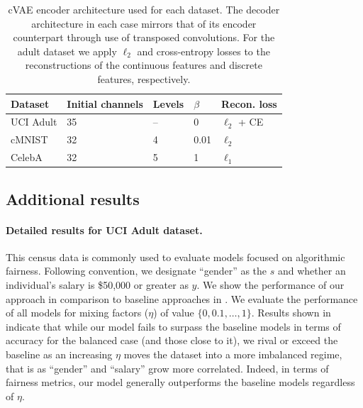 \begin{table}[tp]
\caption{
    \ac{cVAE} encoder architecture used for each dataset. The decoder architecture in each case mirrors that
of its encoder counterpart through use of transposed convolutions. For the adult dataset we apply
$\ell_2$ and cross-entropy losses to the reconstructions of the continuous features and discrete
features, respectively. }
\label{tab:vae_architectures}
\centering
\begin{tabular}{lllll}
\toprule
Dataset   & Initial channels & Levels & $\beta$ & Recon. loss \\
\midrule
UCI Adult & 35               & --     & 0       & $\ell_2$ + CE\\
cMNIST    & 32               & 4      & 0.01    & $\ell_2$ \\
CelebA    & 32               & 5      & 1       & $\ell_1$ \\ 
\bottomrule
\end{tabular}
\end{table}
%
\subsection{Additional results}\label{sec:additional-results}
%
\paragraph{Detailed results for UCI Adult dataset.}
%
This census data is commonly used to evaluate models focused on algorithmic fairness. 
%
Following convention, we designate ``gender'' as the $s$ and whether an individual's salary is
\$50,000 or greater as $y$. 
%
We show the performance of our approach in comparison to baseline approaches in
. 
%
We evaluate the performance of all models for mixing factors ($\eta$) of value \( \{0, 0.1, \dots,
1\} \). 
%
Results shown in  indicate that while our model fails to surpass the
baseline models in terms of accuracy for the balanced case (and those close to it), we rival or
exceed the baseline as an increasing \(\eta\) moves the dataset into a more imbalanced regime, that
is as ``gender'' and ``salary'' grow more correlated.
%
%
Indeed, in terms of fairness metrics, our model generally outperforms the baseline models
regardless of $\eta$.

